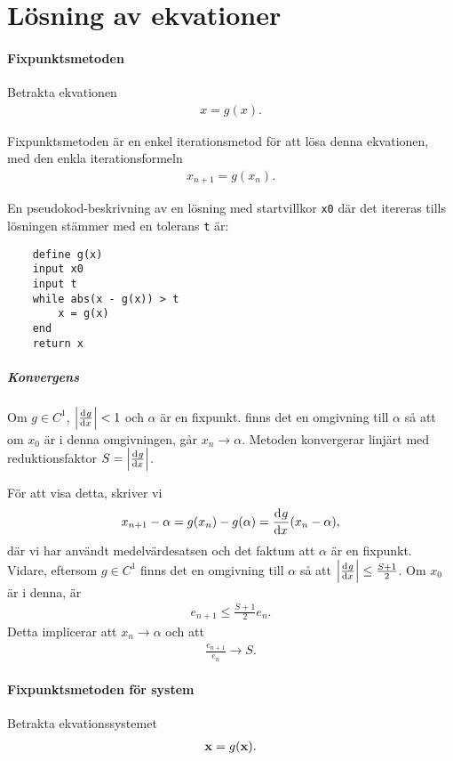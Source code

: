 \section{Lösning av ekvationer}

\paragraph{Fixpunktsmetoden}
Betrakta ekvationen
\begin{align*}
	x = g(x).
\end{align*}

Fixpunktsmetoden är en enkel iterationsmetod för att lösa denna ekvationen, med den enkla iterationsformeln
\begin{align*}
	x_{n + 1} = g(x_{n}).
\end{align*}

En pseudokod-beskrivning av en lösning med startvillkor \verb|x0| där det itereras tills lösningen stämmer med en tolerans \verb|t| är:
\begin{lstlisting}
	define g(x)
	input x0
	input t
	while abs(x - g(x)) > t
		x = g(x)
	end
	return x
\end{lstlisting}

\subparagraph{Konvergens}
Om $g\in C^{1}$, $\abs{\dv[]{g}{x} (\alpha)} < 1$ och $\alpha$ är en fixpunkt. finns det en omgivning till $\alpha$ så att om $x_{0}$ är i denna omgivningen, går $x_{n}\to\alpha$. Metoden konvergerar linjärt med reduktionsfaktor $S = \abs{\dv[]{g}{x} (\alpha)}$.

För att visa detta, skriver vi
\begin{align*}
	x_{n + 1} - \alpha = g(x_{n}) - g(\alpha) = \dv[]{g}{x} (c)(x_{n} - \alpha),
\end{align*}
där vi har användt medelvärdesatsen och det faktum att $\alpha$ är en fixpunkt. Vidare, eftersom $g\in C^{1}$ finns det en omgivning till $\alpha$ så att $\abs{\dv[]{g}{x} (x)}\leq \frac{S + 1}{2}$. Om $x_{0}$ är i denna, är 
\begin{align*}
	e_{n + 1} \leq \frac{S + 1}{2}e_{n}.
\end{align*}
Detta implicerar att $x_{n} \to \alpha$ och att
\begin{align*}
	\frac{e_{n + 1}}{e_{n}} \to S.
\end{align*}

\paragraph{Fixpunktsmetoden för system}
Betrakta ekvationssystemet
\begin{align*}
	\vb{x} = g(\vb{x}).
\end{align*}

